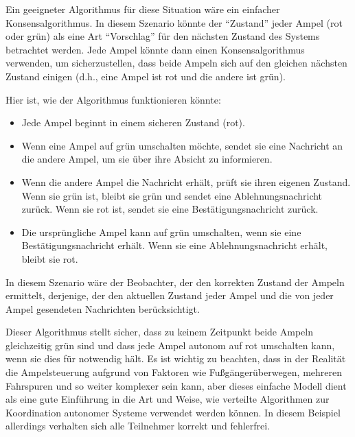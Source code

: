 Ein geeigneter Algorithmus für diese Situation wäre ein einfacher Konsensalgorithmus. In diesem Szenario könnte der \enquote{Zustand} jeder Ampel (rot oder grün) als eine Art \enquote{Vorschlag} für den nächsten Zustand des Systems betrachtet werden. Jede Ampel könnte dann einen Konsensalgorithmus verwenden, um sicherzustellen, dass beide Ampeln sich auf den gleichen nächsten Zustand einigen (d.h., eine Ampel ist rot und die andere ist grün).

Hier ist, wie der Algorithmus funktionieren könnte:
\begin{itemize}
\item Jede Ampel beginnt in einem sicheren Zustand (rot).
\item  Wenn eine Ampel auf grün umschalten möchte, sendet sie eine Nachricht an die andere Ampel, um sie über ihre Absicht zu informieren.
\item Wenn die andere Ampel die Nachricht erhält, prüft sie ihren eigenen Zustand. Wenn sie grün ist, bleibt sie grün und sendet eine Ablehnungsnachricht zurück. Wenn sie rot ist, sendet sie eine Bestätigungsnachricht zurück.
\item  Die ursprüngliche Ampel kann auf grün umschalten, wenn sie eine Bestätigungsnachricht erhält. Wenn sie eine Ablehnungsnachricht erhält, bleibt sie rot.
\end{itemize}
In diesem Szenario wäre der Beobachter, der den korrekten Zustand der Ampeln ermittelt, derjenige, der den aktuellen Zustand jeder Ampel und die von jeder Ampel gesendeten Nachrichten berücksichtigt.

Dieser Algorithmus stellt sicher, dass zu keinem Zeitpunkt beide Ampeln gleichzeitig grün sind und dass jede Ampel autonom auf rot umschalten kann, wenn sie dies für notwendig hält. Es ist wichtig zu beachten, dass in der Realität die Ampelsteuerung aufgrund von Faktoren wie Fußgängerüberwegen, mehreren Fahrspuren und so weiter komplexer sein kann, aber dieses einfache Modell dient als eine gute Einführung in die Art und Weise, wie verteilte Algorithmen zur Koordination autonomer Systeme verwendet werden können.
In diesem Beispiel allerdings verhalten sich alle Teilnehmer korrekt und fehlerfrei.

